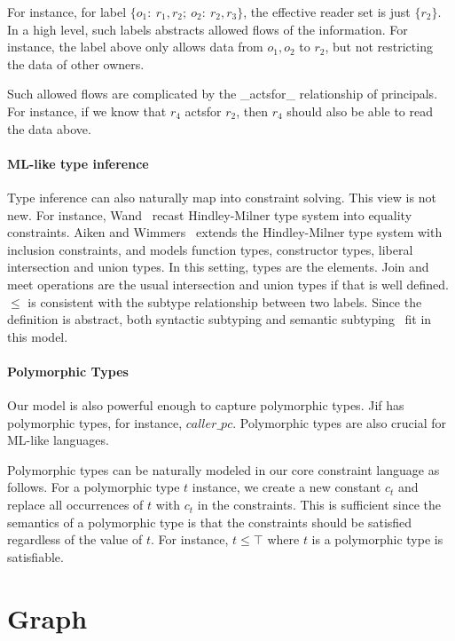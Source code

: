 For instance, for label $\{o_1:\ r_1,r_2;\ o_2:\ r_2,r_3\}$, the
effective reader set is just $\{r_2\}$. In a high level, such labels
abstracts allowed flows of the information. For instance, the label
above only allows data from $o_1, o_2$ to $r_2$, but not restricting
the data of other owners.

Such allowed flows are complicated by the _actsfor_ relationship of
principals. For instance, if we know that $r_4$ actsfor $r_2$, then
$r_4$ should also be able to read the data above.

\paragraph{ML-like type inference}

Type inference can also naturally map into constraint solving. This
view is not new. For instance, Wand~\cite{wand-typeinference} recast
Hindley-Milner type system into equality constraints. Aiken and
Wimmers~\cite{aiken-typeinclusion} extends the Hindley-Milner type
system with inclusion constraints, and models function types,
constructor types, liberal intersection and union types. In this setting, types
are the elements. Join and meet operations are the usual intersection and union
types if that is well defined.  $\leq$ is consistent with the subtype
relationship between two labels.  Since the definition is abstract, both
syntactic subtyping  and semantic subtyping~\cite{aiken-typeinclusion}
fit in this model.

\paragraph{Polymorphic Types}

Our model is also powerful enough to capture polymorphic types.  Jif
has polymorphic types, for instance, $caller\_pc$. Polymorphic types
are also crucial for ML-like languages.

Polymorphic types can be naturally modeled in our core constraint
language as follows. For a polymorphic type $t$ instance, we create a
new constant $c_t$ and replace all occurrences of $t$ with $c_t$ in
the constraints. This is sufficient since the semantics of a
polymorphic type is that the constraints should be satisfied
regardless of the value of $t$. For instance, $t\leq \top$ where $t$
is a polymorphic type is satisfiable.

\section{Graph} 

